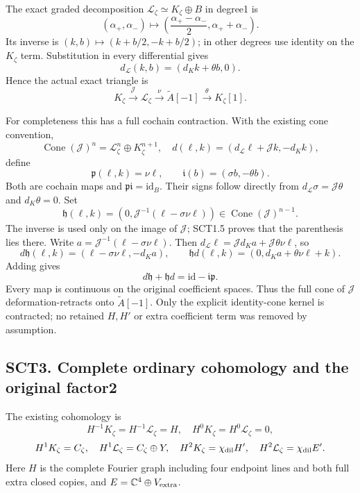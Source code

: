 The exact graded decomposition
\(\mathcal L_\zeta\simeq K_\zeta\oplus B\) in degree1 is \[
(\alpha_+,\alpha_-)\longmapsto
\left(\frac{\alpha_+-\alpha_-}{2},\alpha_++\alpha_-\right).
\tag{SCT2.2}
\] Its inverse is \((k,b)\mapsto(k+b/2,-k+b/2)\); in other degrees use
identity on the \(K_\zeta\) term. Substitution in every differential
gives \[
d_{\mathcal L}(k,b)=(d_Kk+\theta b,0).
\tag{SCT2.3}
\] Hence the actual exact triangle is \[
\boxed{K_\zeta\xrightarrow{\mathcal J}\mathcal L_\zeta
\xrightarrow{\nu}\widetilde A[-1]\xrightarrow{\theta}K_\zeta[1].}
\tag{SCT2.4}
\]

For completeness this has a full cochain contraction. With the existing
cone convention, \[
\operatorname{Cone}(\mathcal J)^n=\mathcal L_\zeta^n\oplus K_\zeta^{n+1},
\quad d(\ell,k)=(d_{\mathcal L}\ell+\mathcal Jk,-d_Kk),
\] define \[
\mathfrak p(\ell,k)=\nu\ell,\qquad
\mathfrak i(b)=(\sigma b,-\theta b).
\tag{SCT2.5}
\] Both are cochain maps and \(\mathfrak p\mathfrak i=\mathrm{id}_B\).
Their signs follow directly from
\(d_{\mathcal L}\sigma=\mathcal J\theta\) and \(d_K\theta=0\). Set \[
\mathfrak h(\ell,k)=
\left(0,\mathcal J^{-1}(\ell-\sigma\nu\ell)\right)
\in\operatorname{Cone}(\mathcal J)^{n-1}.
\tag{SCT2.6}
\] The inverse is used only on the image of \(\mathcal J\); SCT1.5
proves that the parenthesis lies there. Write
\(a=\mathcal J^{-1}(\ell-\sigma\nu\ell)\). Then
\(d_{\mathcal L}\ell=\mathcal Jd_Ka+\mathcal J\theta\nu\ell\), so \[
d\mathfrak h(\ell,k)=(\ell-\sigma\nu\ell,-d_Ka),\qquad
\mathfrak h d(\ell,k)=(0,d_Ka+\theta\nu\ell+k).
\] Adding gives \[
\boxed{d\mathfrak h+\mathfrak h d
=\mathrm{id}-\mathfrak i\mathfrak p.}
\tag{SCT2.7}
\] Every map is continuous on the original coefficient spaces. Thus the
full cone of \(\mathcal J\) deformation-retracts onto
\(\widetilde A[-1]\). Only the explicit identity-cone kernel is
contracted; no retained \(H,H'\) or extra coefficient term was removed
by assumption.

\subsection{SCT3. Complete ordinary cohomology and the original
factor2}\label{sct3.-complete-ordinary-cohomology-and-the-original-factor2}

The existing cohomology is \[
H^{-1}K_\zeta=H^{-1}\mathcal L_\zeta=H,\quad
H^0K_\zeta=H^0\mathcal L_\zeta=0,
\] \[
H^1K_\zeta=C_\zeta,\quad H^1\mathcal L_\zeta=C_\zeta\oplus Y,
\quad H^2K_\zeta=\chi_{\rm dil}H',
\quad H^2\mathcal L_\zeta=\chi_{\rm dil}E'.
\] Here \(H\) is the complete Fourier graph including four endpoint
lines and both full extra closed copies, and
\(E=\mathbb C^4\oplus V_{\rm extra}\).

